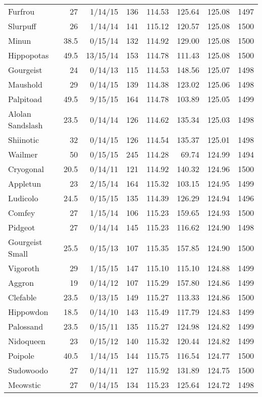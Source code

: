 \begin{longtable}{lrrrrrrr}
Furfrou & 27 & 1/14/15 & 136 & 114.53 & 125.64 & 125.08 & 1497\\
Slurpuff & 26 & 1/14/14 & 141 & 115.12 & 120.57 & 125.08 & 1500\\
Minun & 38.5 & 0/15/14 & 132 & 114.92 & 129.00 & 125.08 & 1500\\
Hippopotas & 49.5 & 13/15/14 & 153 & 114.78 & 111.43 & 125.08 & 1500\\
Gourgeist & 24 & 0/14/13 & 115 & 114.53 & 148.56 & 125.07 & 1498\\
Maushold & 29 & 0/14/15 & 139 & 114.38 & 123.02 & 125.06 & 1498\\
Palpitoad & 49.5 & 9/15/15 & 164 & 114.78 & 103.89 & 125.05 & 1499\\
Alolan Sandslash & 23.5 & 0/14/14 & 126 & 114.62 & 135.34 & 125.03 & 1498\\
Shiinotic & 32 & 0/14/15 & 126 & 114.54 & 135.37 & 125.01 & 1498\\
Wailmer & 50 & 0/15/15 & 245 & 114.28 & 69.74 & 124.99 & 1494\\
Cryogonal & 20.5 & 0/14/11 & 121 & 114.92 & 140.32 & 124.96 & 1500\\
Appletun & 23 & 2/15/14 & 164 & 115.32 & 103.15 & 124.95 & 1499\\
Ludicolo & 24.5 & 0/15/15 & 135 & 114.39 & 126.29 & 124.94 & 1496\\
Comfey & 27 & 1/15/14 & 106 & 115.23 & 159.65 & 124.93 & 1500\\
Pidgeot & 27 & 0/14/14 & 145 & 115.23 & 116.62 & 124.90 & 1498\\
Gourgeist Small & 25.5 & 0/15/13 & 107 & 115.35 & 157.85 & 124.90 & 1500\\
Vigoroth & 29 & 1/15/15 & 147 & 115.10 & 115.10 & 124.88 & 1499\\
Aggron & 19 & 0/14/12 & 107 & 115.29 & 157.80 & 124.86 & 1499\\
Clefable & 23.5 & 0/13/15 & 149 & 115.27 & 113.33 & 124.86 & 1500\\
Hippowdon & 18.5 & 0/14/10 & 143 & 115.49 & 117.79 & 124.83 & 1499\\
Palossand & 23.5 & 0/15/11 & 135 & 115.27 & 124.98 & 124.82 & 1499\\
Nidoqueen & 23 & 0/15/12 & 140 & 115.32 & 120.44 & 124.82 & 1499\\
Poipole & 40.5 & 1/14/15 & 144 & 115.75 & 116.54 & 124.77 & 1500\\
Sudowoodo & 27 & 0/14/11 & 127 & 115.92 & 131.89 & 124.75 & 1500\\
Meowstic & 27 & 0/14/15 & 134 & 115.23 & 125.64 & 124.72 & 1498\\

\end{longtable}
